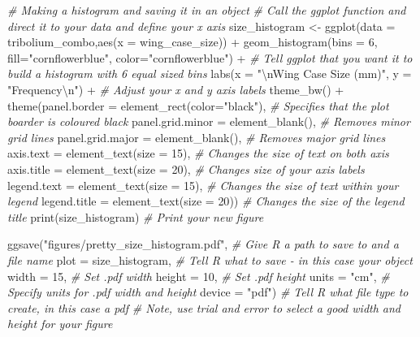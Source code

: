 \documentclass[
]{book}
\newenvironment{Shaded}{\begin{snugshade}}{\end{snugshade}}
\newcommand{\AttributeTok}[1]{\textcolor[rgb]{0.77,0.63,0.00}{#1}}
\newcommand{\CommentTok}[1]{\textcolor[rgb]{0.56,0.35,0.01}{\textit{#1}}}
\newcommand{\DecValTok}[1]{\textcolor[rgb]{0.00,0.00,0.81}{#1}}
\newcommand{\FunctionTok}[1]{\textcolor[rgb]{0.00,0.00,0.00}{#1}}
\newcommand{\NormalTok}[1]{#1}
\newcommand{\OtherTok}[1]{\textcolor[rgb]{0.56,0.35,0.01}{#1}}
\newcommand{\SpecialCharTok}[1]{\textcolor[rgb]{0.00,0.00,0.00}{#1}}
\newcommand{\StringTok}[1]{\textcolor[rgb]{0.31,0.60,0.02}{#1}}
\begin{document}
\begin{Shaded}
\begin{Highlighting}[]
\CommentTok{\# Making a histogram and saving it in an object}
\CommentTok{\# Call the ggplot function and direct it to your data and define your x axis}
\NormalTok{size\_histogram }\OtherTok{\textless{}{-}} \FunctionTok{ggplot}\NormalTok{(}\AttributeTok{data =}\NormalTok{ tribolium\_combo,}\FunctionTok{aes}\NormalTok{(}\AttributeTok{x =}\NormalTok{ wing\_case\_size)) }\SpecialCharTok{+} 
  \FunctionTok{geom\_histogram}\NormalTok{(}\AttributeTok{bins =} \DecValTok{6}\NormalTok{, }\AttributeTok{fill=}\StringTok{"cornflowerblue"}\NormalTok{, }\AttributeTok{color=}\StringTok{"cornflowerblue"}\NormalTok{) }\SpecialCharTok{+} \CommentTok{\# Tell ggplot that you want it to build a histogram with 6 equal sized bins}
  \FunctionTok{labs}\NormalTok{(}\AttributeTok{x =} \StringTok{"}\SpecialCharTok{\textbackslash{}n}\StringTok{Wing Case Size (mm)"}\NormalTok{, }\AttributeTok{y =} \StringTok{"Frequency}\SpecialCharTok{\textbackslash{}n}\StringTok{"}\NormalTok{) }\SpecialCharTok{+} \CommentTok{\# Adjust your x and y axis labels }
  \FunctionTok{theme\_bw}\NormalTok{() }\SpecialCharTok{+}
  \FunctionTok{theme}\NormalTok{(}\AttributeTok{panel.border =} \FunctionTok{element\_rect}\NormalTok{(}\AttributeTok{color=}\StringTok{"black"}\NormalTok{), }\CommentTok{\# Specifies that the plot boarder is coloured black}
        \AttributeTok{panel.grid.minor =} \FunctionTok{element\_blank}\NormalTok{(), }\CommentTok{\# Removes minor grid lines }
        \AttributeTok{panel.grid.major =} \FunctionTok{element\_blank}\NormalTok{(), }\CommentTok{\# Removes major grid lines }
        \AttributeTok{axis.text =} \FunctionTok{element\_text}\NormalTok{(}\AttributeTok{size =} \DecValTok{15}\NormalTok{), }\CommentTok{\# Changes the size of text on both axis }
        \AttributeTok{axis.title =} \FunctionTok{element\_text}\NormalTok{(}\AttributeTok{size =} \DecValTok{20}\NormalTok{), }\CommentTok{\# Changes size of your axis labels }
        \AttributeTok{legend.text =} \FunctionTok{element\_text}\NormalTok{(}\AttributeTok{size =} \DecValTok{15}\NormalTok{), }\CommentTok{\# Changes the size of text within your legend}
        \AttributeTok{legend.title =} \FunctionTok{element\_text}\NormalTok{(}\AttributeTok{size =} \DecValTok{20}\NormalTok{)) }\CommentTok{\# Changes the size of the legend title  }
\FunctionTok{print}\NormalTok{(size\_histogram) }\CommentTok{\# Print your new figure}

\FunctionTok{ggsave}\NormalTok{(}\StringTok{"figures/pretty\_size\_histogram.pdf"}\NormalTok{, }\CommentTok{\# Give R a path to save to and a file name}
       \AttributeTok{plot =}\NormalTok{ size\_histogram, }\CommentTok{\# Tell R what to save {-} in this case your object}
       \AttributeTok{width =} \DecValTok{15}\NormalTok{, }\CommentTok{\# Set .pdf width}
       \AttributeTok{height =} \DecValTok{10}\NormalTok{, }\CommentTok{\# Set .pdf height}
       \AttributeTok{units =} \StringTok{"cm"}\NormalTok{, }\CommentTok{\# Specify units for .pdf width and height}
       \AttributeTok{device =} \StringTok{"pdf"}\NormalTok{) }\CommentTok{\# Tell R what file type to create, in this case a pdf}
\CommentTok{\# Note, use trial and error to select a good width and height for your figure}


\end{Highlighting}
\end{Shaded}
\end{document}
